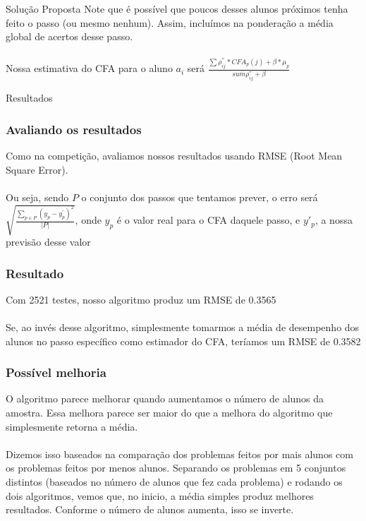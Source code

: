 \documentclass{article}
\begin{document}
\begin{section}{Solução Proposta}
      Note que é possível que poucos desses alunos próximos tenha feito o passo (ou mesmo nenhum). Assim, incluímos na ponderação a média global de acertos desse passo. \\~\\

      Nossa estimativa do CFA para o aluno $a_i$ será $\frac{\sum \rho^{''}_{ij}*CFA_p(j)+\beta * \mu_p}{sum \rho^{''}_{ij} +\beta}$


      \begin{subsection}{Resultados}
         \subsubsection{Avaliando os resultados}

         Como na competição, avaliamos nossos resultados usando RMSE (Root Mean Square Error).\\~\\

         Ou seja, sendo $P$ o conjunto dos passos que tentamos prever, o erro será $\sqrt{\frac{\sum_{p \in P} (y_p - y^{'}_p)^2}{|P|}}$, onde $y_p$ é o valor real para o CFA daquele passo, e $y'_p$, a nossa previsão desse valor

         \subsubsection{Resultado}

         Com 2521 testes, nosso algoritmo produz um RMSE de 0.3565 \\~\\

         Se, ao invés desse algoritmo, simplesmente tomarmos a média de desempenho dos alunos no passo específico como estimador do CFA, teríamos um RMSE de 0.3582


         \subsubsection{Possível melhoria}

         O algoritmo parece melhorar quando aumentamos o número de alunos da amostra. Essa melhora parece ser maior do que a melhora do algoritmo que simplesmente retorna a média. \\~\\

         Dizemos isso baseados na comparação dos problemas feitos por mais alunos com os problemas feitos por menos alunos. Separando os problemas em 5 conjuntos distintos (baseados no número de alunos que fez cada problema) e rodando os dois algoritmos, vemos que, no inicio, a média simples produz melhores resultados. Conforme o número de alunos aumenta, isso se inverte.



\end{subsection}
\end{section}
\end{document}
